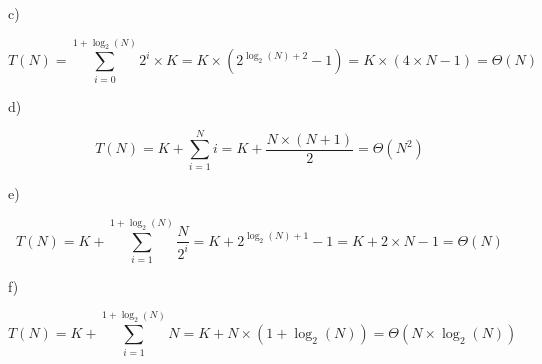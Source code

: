 \documentclass[a4paper,11pt]{article}
\begin{document}
	\newpage
	
	\noindent c)
	
	\begin{figure}[h]
		\centering
	\end{figure}
	\[
		T(N) = \sum_{i=0}^{1 + \log_2(N)} 2^i \times K = K \times (2^{\log_2(N) + 2} - 1) = K \times (4 \times N - 1) = \Theta(N)
	\]
	
	\noindent d)
	
	\begin{figure}[h]
		\centering
	\end{figure}
	\[
		T(N) = K + \sum_{i=1}^{N} i = K + \frac{N \times (N + 1)}{2} = \Theta(N^2)
	\]
	
	\noindent e)
	
	\begin{figure}[h]
		\centering
	\end{figure}
	\[
		T(N) = K + \sum_{i=1}^{1 + \log_2(N)} \frac{N}{2^i} = K + 2^{\log_2(N) + 1} - 1 = K + 2 \times N - 1 = \Theta(N)
	\]
	
	\newpage
	
	\noindent f)
	
	\begin{figure}[h]
		\centering
	\end{figure}
	\[
		T(N) = K + \sum_{i=1}^{1 + \log_2(N)} N = K + N \times (1 + \log_2(N)) = \Theta(N \times \log_2(N))
	\]
	
\end{document}
